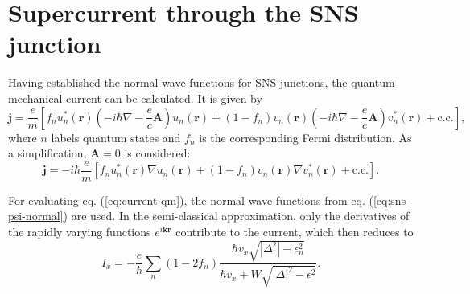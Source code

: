 \section{Supercurrent through the SNS junction}
Having established the normal wave functions for SNS junctions, the quantum-mechanical current can be calculated. It is given by
\begin{equation}
\mathbf{j} = \frac{e}{m} \left[ f_n u_n^* \left( \mathbf{r} \right) \left( - i \hbar \nabla - \frac{e}{c} \mathbf{A} \right) u_n\left( \mathbf{r} \right) + \left(1-f_n\right) v_n\left( \mathbf{r} \right) \left( -i \hbar \nabla - \frac{e}{c} \mathbf{A} \right) v_n^*\left( \mathbf{r} \right) + \text{c.c.} \right], \label{eq:current-qm}
\end{equation}
where $n$ labels quantum states and $f_n$ is the corresponding Fermi distribution.
As a simplification, $\mathbf{A} = 0$ is considered:
\begin{equation}
\mathbf{j} = - i \hbar  \frac{e}{m} \left[ f_n u_n^* \left( \mathbf{r} \right) \nabla  u_n \left( \mathbf{r} \right) + \left(1-f_n\right) v_n\left( \mathbf{r} \right) \nabla v_n^*\left( \mathbf{r} \right) + \text{c.c.} \right].
\end{equation}

For evaluating eq. (\ref{eq:current-qm}), the normal wave functions from eq. (\ref{eq:sns-psi-normal}) are used. In the semi-classical approximation, only the derivatives of the rapidly varying functions $e^{i\mathbf{k r}}$ contribute to the current, which then reduces to
\begin{equation}
I_x = - \frac{e}{\hbar} \sum_n \left(1- 2 f_n \right) \frac{\hbar v_x \sqrt{|\Delta^2| - \epsilon_n^2}}{\hbar v_x + W \sqrt{|\Delta|^2 -\epsilon^2}}.
\end{equation}
